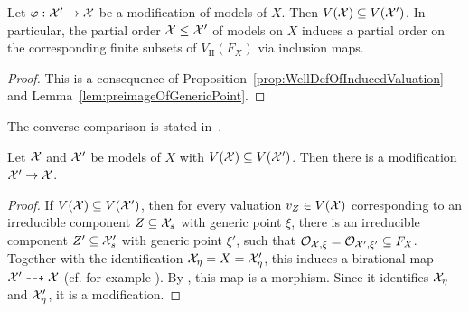 \begin{lemma}\label{lemma:induced-order-on-valuations}
    Let $\varphi: \mathcal X' \to \mathcal X$ be a modification of models of $X$.
    Then $V(\mathcal X) \subseteq V(\mathcal X')$.
    In particular, the partial order $\mathcal X \leq \mathcal X'$ of models on $X$ induces a partial order on the corresponding finite
    subsets of $V_{\mathrm{II}}(F_X)$ via inclusion maps.
\end{lemma}

\begin{proof}
    This is a consequence of Proposition~\ref{prop:WellDefOfInducedValuation} and Lemma~\ref{lem:preimageOfGenericPoint}.
\end{proof}

The converse comparison is stated in~\cite[Lemma 3.8]{Rueth}.

\begin{proposition}
    Let $\mathcal X$ and $\mathcal X'$ be models of $X$ with $V(\mathcal X) \subseteq V(\mathcal X')$.
    Then there is a modification $\mathcal X' \to \mathcal X$.
\end{proposition}

\begin{proof}
    If $V(\mathcal X) \subseteq V(\mathcal X')$, then for every valuation $v_Z \in V(\mathcal X)$ corresponding to an irreducible component $Z\subseteq \mathcal X_s$ with generic point $\xi$,
    there is an irreducible component $Z' \subseteq \mathcal X'_s$ with generic point $\xi'$, such that $\mathcal{O}_{\mathcal X,\xi} = \mathcal{O}_{\mathcal X',\xi'} \subseteq F_X$.
    Together with the identification $\mathcal X_\eta = X = \mathcal X'_\eta$, this induces a birational map $\mathcal X' \dashrightarrow \mathcal X$ (cf. for example \cite[Lemma 29.50.2.]{Stacks}).
    By \cite[Theorem 8.3.20]{Liu}, this map is a morphism. Since it identifies $\mathcal X_\eta$ and $\mathcal X'_\eta$, it is a modification.
\end{proof}

